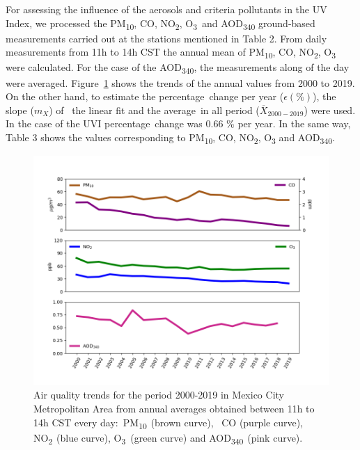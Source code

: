 \documentclass[10pt]{article}
\begin{document}
For assessing the influence of the aerosols and criteria pollutants in
the UV Index, we processed the PM\textsubscript{10}, CO,
NO\textsubscript{2}, O\textsubscript{3}~and AOD\textsubscript{340}
ground-based measurements carried out at the stations mentioned in Table
2. From daily measurements from 11h to 14h CST the annual mean of
PM\textsubscript{10}, CO, NO\textsubscript{2}, O\textsubscript{3} were
calculated. For the case of the AOD\textsubscript{340}, the measurements
along of the day were averaged. Figure~{\ref{610674}}{
shows the trends of the annual values from 2000 to 2019. On the other
hand, to estimate the percentage~change per year (}\(\epsilon\left(\%\right)\)),
the slope (\(m_ {X}\)) of~ the linear fit and the average~in all
period (\(\overline{X}_{2000-2019}\)) were used. In the case of the UVI
percentage~change was 0.66 \% per year. In the same way, Table 3 shows
the values corresponding to PM\textsubscript{10}, CO,
NO\textsubscript{2}, O\textsubscript{3} and AOD\textsubscript{340}.~
\begin{figure}[H]
\begin{center}
\includegraphics[width=0.56\columnwidth]{contCDMX}
\caption{{Air quality trends for the period 2000-2019 in Mexico City Metropolitan
Area from annual averages obtained between 11h to 14h CST every
day:~PM\textsubscript{10~}(brown curve),~ CO (purple curve),
NO\textsubscript{2~}(blue curve), O\textsubscript{3}~(green curve) and
AOD\textsubscript{340~}(pink curve).
{\label{610674}}%
}}
\end{center}
\end{figure}
\end{document}
